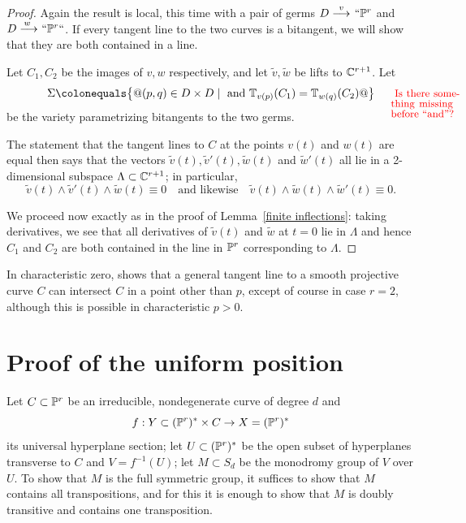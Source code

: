  \begin{proof} Again the result is local, this time with a pair of germs
 $D\ruto {\ v} ` `\PP^r$ and $D\ruto {\,w} ` `\PP^r` `$. If every
 tangent line to the two curves is a bitangent, we will show that they
 are both contained in a line.

  Let $C_1, C_2$ be the images of $v,w$ respectively, and let $\tilde v,
  \tilde w$ be lifts to ${\mathbb C}^{r+1}$.
 Let
 $$
 \Sigma \colonequals  \bigl\{@ (p,q) \in D \times D \mid \text{ and
 }\TT_{v(p)}(C_1) = \TT_{w(q)}(C_2)@ \bigr\}
\marginparhere{\redden{Is there something missing before ``and''?}}
 $$
 be the variety parametrizing bitangents to the two germs.



 The statement that the tangent lines to $C$ at the points $v(t)$
 and $w(t)$ are equal then says that the vectors $\tilde v(t), \tilde
 v'(t),\tilde w(t)$ and $\tilde w'(t)$ all lie in a 2-dimen\-sional subspace
 $\Lambda \subset {\mathbb C}^{r+1}$; in particular,
 $$
 \tilde v(t) \wedge \tilde v'(t) \wedge \tilde w(t) \equiv 0 \quad
 \text{and likewise} \quad \tilde v(t) \wedge \tilde w(t) \wedge \tilde
 w'(t) \equiv 0
.
 $$

We proceed now exactly as in the proof of Lemma~\ref{finite inflections}:
taking derivatives, we see that all derivatives of $\tilde v(t)$
and $\tilde w$ at $t=0$ lie in $\Lambda$
and hence $C_1$ and $C_2$ are both contained in the line in ${\mathbb P}^r$
corresponding to $\Lambda$.
 \end{proof}

In characteristic zero, \cite[Theorem 3.1]{kaji-tangentialDegeneracy}
shows that a general tangent line to a smooth projective curve $C$ can
intersect $C$ in a point other than $p$, except of course in case $r=2$,
although this is possible in characteristic $p>0$.

\section{Proof of the uniform position 
}

Let $C \subset {\mathbb P}^r$ be an irreducible, nondegenerate curve of degree $d$
and 
$$f : Y \subset ({\mathbb P}^r)^* \times C \to  X = ({\mathbb P}^r)^*$$ 
its universal
hyperplane section; let $U \subset ({\mathbb P}^r)^*$ be the open subset of
hyperplanes transverse to $C$ and $V = f^{-1}(U)$; let $M \subset S_d$
be the monodromy group of $V$ over $U$.
To show that  $M$ is the full symmetric group, it suffices to show that
$M$ contains all transpositions, and for this it is enough to show that
%
$M$ is doubly transitive and contains one transposition.

